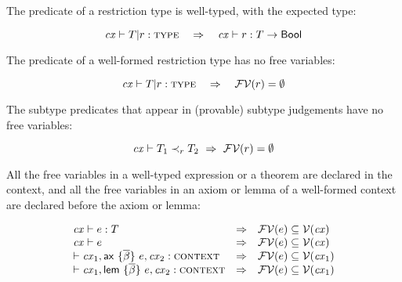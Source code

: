 
The predicate of a restriction type is well-typed, with the expected type:

\begin{theorem}\label{thm-tspred-wt}
\[
\istyO{\tsubO}\ \ \IMPLIES\ \ \hastyO{\tspred}{\tarr{\typ}{\bool}}
\]
\end{theorem}

The predicate of a well-formed restriction type has no free variables:

\begin{theorem}\label{thm-no-free-vars-in-types}
\[
\istyO{\tsubO}\ \ \IMPLIES\ \ \efvar{\tspred}=\emptyset
\]
\end{theorem}

The subtype predicates that appear in (provable) subtype judgements have no
free variables:

\begin{theorem}\label{thm-subpred-no-free-vars}
\[
\mathit{cx}\vdash T_1\prec_{r}T_2\ \Rightarrow\ \mathcal{FV}(r)=\emptyset
\]
\end{theorem}

All the free variables in a well-typed expression or a theorem are declared in
the context, and all the free variables in an axiom or lemma of a well-formed
context are declared before the axiom or lemma:

\begin{theorem}\label{thm-free-var-in-cx}
\[
\begin{array}{l@{\ \ \IMPLIES\ \ }l}
\hastyO{\expr}{\typ}     & \efvar{\expr}\subseteq\cxvarO       \\
\theoO{\expr}            & \efvar{\expr}\subseteq\cxvarO       \\
\cxwf{\cx_1,\axO, \cx_2} & \efvar{\expr}\subseteq\cxvar{\cx_1} \\
\cxwf{\cx_1,\lemO,\cx_2} & \efvar{\expr}\subseteq\cxvar{\cx_1}
\end{array}
\]
\end{theorem}



